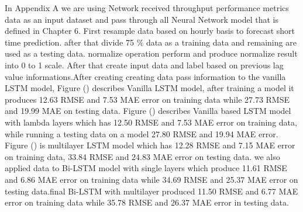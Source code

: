 In Appendix A  we are using Network received throughput performance metrics data as an input dataset and pass through all Neural Network model that is defined in Chapter 6. First resample data based on hourly basis to forecast short time prediction. after that divide 75 \% data as a training data and remaining are used as a testing data. normalize operation perform and produce normalize result into 0 to 1 scale. After that create input data and label based on previous lag value informations.After creating creating data pass information to the vanilla LSTM model, Figure () describes Vanilla LSTM model, after training a  model it produces 12.63 RMSE and 7.53 MAE error on training data while 27.73 RMSE and 19.99 MAE on testing data. Figure () describes Vanilla based LSTM model with lambda layers which has 12.50 RMSE and 7.53 MAE error on training data, while running a testing data on a model 27.80 RMSE and 19.94 MAE error. Figure () is multilayer LSTM model which has 12.28 RMSE and 7.15 MAE error on training data, 33.84 RMSE and 24.83 MAE error on testing data.
we also applied data to Bi-LSTM model with single layers which produce 11.61 RMSE and 6.86 MAE error on training data while 34.69 RMSE and 25.37  MAE error on testing data.final Bi-LSTM with multilayer produced 11.50 RMSE and 6.77 MAE error on training data while 35.78 RMSE and 26.37 MAE error in testing data.